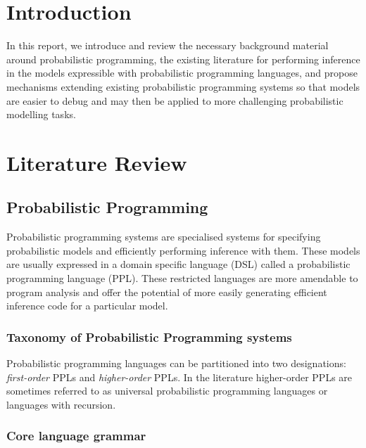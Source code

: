 \documentclass[12pt]{article}
\theoremstyle{definition}
\begin{document}
\doublespacing	
	
\setlength{\belowdisplayskip}{12pt} \setlength{\belowdisplayshortskip}{12pt}
\setlength{\abovedisplayskip}{12pt} \setlength{\abovedisplayshortskip}{12pt}


\section{Introduction}

In this report, we introduce and review the necessary background
material around probabilistic programming, the existing literature for
performing inference in the models expressible with probabilistic
programming languages, and propose mechanisms extending existing
probabilistic programming systems so that models are easier to debug
and may then be applied to more challenging probabilistic modelling
tasks.

\section{Literature Review}

\subsection{Probabilistic Programming}

Probabilistic programming systems \citep{gordon2014probabilistic}
are specialised systems for specifying probabilistic models and
efficiently performing inference with them. These models are usually
expressed in a domain specific language (DSL) called a probabilistic
programming language (PPL). These restricted languages are more
amendable to program analysis and offer the potential of more easily
generating efficient inference code for a particular model.




\subsubsection{Taxonomy of Probabilistic Programming systems}

Probabilistic programming languages can be partitioned into two
designations: \emph{first-order} PPLs and \emph{higher-order} PPLs. In
the literature higher-order PPLs are sometimes referred to as
universal probabilistic programming languages \citep{infcomp2017,
  yang2014generating} or languages with recursion.

\subsubsection{Core language grammar}
\end{document}
